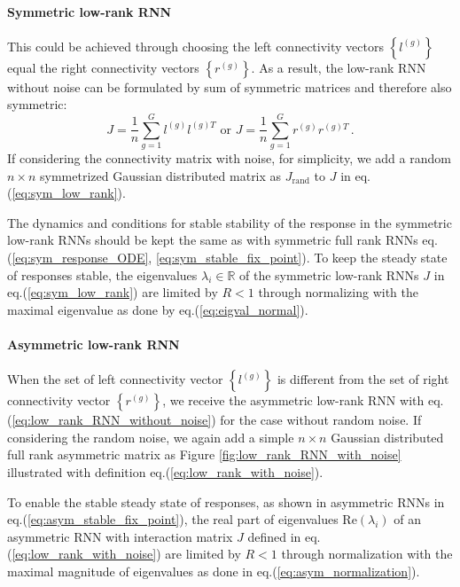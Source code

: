 \documentclass[11pt]{article}
\begin{document}
	\paragraph{Symmetric low-rank RNN}This could be achieved through choosing the left connectivity vectors $\left\{l^{(g)}\right\}$ equal the right connectivity vectors $\left\{r^{(g)}\right\}$. As a result, the low-rank RNN without noise can be formulated by sum of symmetric matrices and therefore also symmetric:
		\begin{equation} \label{eq:sym_low_rank}
			J = \frac{1}{n}\sum_{g =1}^{G} l^{(g)} l^{(g)T} \, \, \text{or} \, \, J = \frac{1}{n}\sum_{g =1}^{G} r^{(g)} r^{(g)T} \, .
		\end{equation}
	If considering the connectivity matrix with noise, for simplicity, we add a random $n \times n$ symmetrized Gaussian distributed matrix as $J_{\text{rand}}$ to $J$ in eq.(\ref{eq:sym_low_rank}).
	
	The dynamics and conditions for stable stability of the response in the symmetric low-rank RNNs should be kept the same as with symmetric full rank RNNs eq.(\ref{eq:sym_response_ODE}, \ref{eq:sym_stable_fix_point}). To keep the steady state of responses stable, the eigenvalues $\lambda_i \in \mathbb{R}$ of the symmetric low-rank RNNs $J$ in eq.(\ref{eq:sym_low_rank}) are limited by $R < 1$ through normalizing with the maximal eigenvalue as done by eq.(\ref{eq:eigval_normal}). 
	
	\paragraph{Asymmetric low-rank RNN} When the set of left connectivity vector  $\left\{l^{(g)}\right\}$ is different from the set of right connectivity vector $\left\{r^{(g)}\right\}$, we receive the asymmetric low-rank RNN with eq.(\ref{eq:low_rank_RNN_without_noise}) for the case without random noise. If considering the random noise, we again add a simple $n \times n$ Gaussian distributed full rank asymmetric matrix as Figure \ref{fig:low_rank_RNN_with_noise} illustrated with definition  eq.(\ref{eq:low_rank_with_noise}). 
	
	To enable the stable steady state of responses, as shown in asymmetric RNNs in eq.(\ref{eq:asym_stable_fix_point}), the real part of eigenvalues $\text{Re}(\lambda_i)$ of an asymmetric RNN with interaction matrix $J$ defined in eq.(\ref{eq:low_rank_with_noise}) are limited by $R < 1$ through normalization with the maximal magnitude of eigenvalues as done in eq.(\ref{eq:asym_normalization}). 
	
\end{document}

